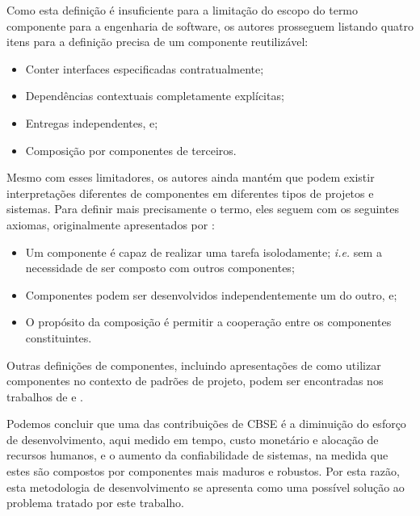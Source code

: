 Como esta definição é insuficiente para a limitação do escopo do termo componente para a engenharia de software, os autores prosseguem listando quatro itens para a definição precisa de um componente reutilizável:

\begin{itemize}
    \item Conter interfaces especificadas contratualmente;
    \item Dependências contextuais completamente explícitas;
    \item Entregas independentes, e;
    \item Composição por componentes de terceiros.
\end{itemize}

Mesmo com esses limitadores, os autores ainda mantém que podem existir interpretações diferentes de componentes em diferentes tipos de projetos e sistemas. Para definir mais precisamente o termo, eles seguem com os seguintes axiomas, originalmente apresentados por :

\begin{itemize}
    \item Um componente é capaz de realizar uma tarefa isolodamente; \textit{i.e.} sem a necessidade de ser composto com outros componentes;
    \item Componentes podem ser desenvolvidos independentemente um do outro, e;
    \item O propósito da composição é permitir a cooperação entre os componentes constituintes.
\end{itemize}

Outras definições de componentes, incluindo apresentações de como utilizar componentes no contexto de padrões de projeto, podem ser encontradas nos trabalhos de  e .

Podemos concluir que uma das contribuições de CBSE é a diminuição do esforço de desenvolvimento, aqui medido em tempo, custo monetário e alocação de recursos humanos, e o aumento da confiabilidade de sistemas, na medida que estes são compostos por componentes mais maduros e robustos. Por esta razão, esta metodologia de desenvolvimento se apresenta como uma possível solução ao problema tratado por este trabalho.

